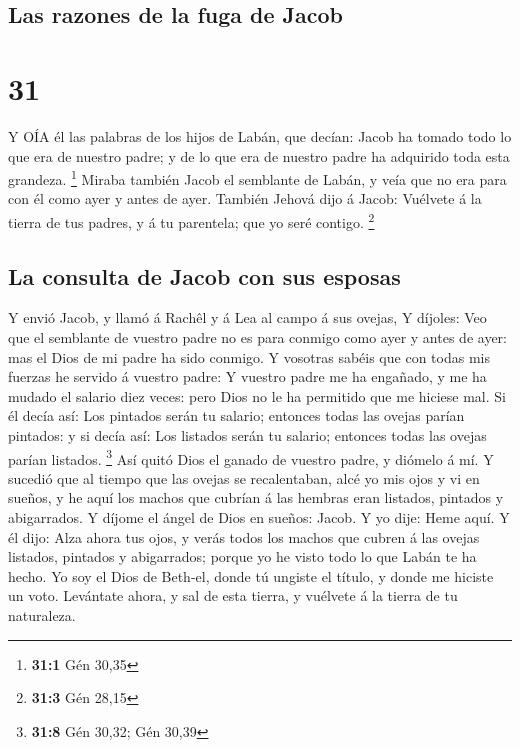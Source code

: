 \hypertarget{las-razones-de-la-fuga-de-jacob}{%
\subsection{Las razones de la fuga de
Jacob}\label{las-razones-de-la-fuga-de-jacob}}

\hypertarget{section-30}{%
\section{31}\label{section-30}}

 Y OÍA él las palabras de los hijos de Labán, que decían:
Jacob ha tomado todo lo que era de nuestro padre; y de lo que era de
nuestro padre ha adquirido toda esta grandeza. \footnote{\textbf{31:1}
  Gén 30,35}  Miraba también Jacob el semblante de Labán, y
veía que no era para con él como ayer y antes de ayer. 
También Jehová dijo á Jacob: Vuélvete á la tierra de tus padres, y á tu
parentela; que yo seré contigo. \footnote{\textbf{31:3} Gén 28,15}

\hypertarget{la-consulta-de-jacob-con-sus-esposas}{%
\subsection{La consulta de Jacob con sus
esposas}\label{la-consulta-de-jacob-con-sus-esposas}}

 Y envió Jacob, y llamó á Rachêl y á Lea al campo á sus
ovejas,  Y díjoles: Veo que el semblante de vuestro padre no
es para conmigo como ayer y antes de ayer: mas el Dios de mi padre ha
sido conmigo.  Y vosotras sabéis que con todas mis fuerzas
he servido á vuestro padre:  Y vuestro padre me ha engañado,
y me ha mudado el salario diez veces: pero Dios no le ha permitido que
me hiciese mal.  Si él decía así: Los pintados serán tu
salario; entonces todas las ovejas parían pintados: y si decía así: Los
listados serán tu salario; entonces todas las ovejas parían listados.
\footnote{\textbf{31:8} Gén 30,32; Gén 30,39}  Así quitó
Dios el ganado de vuestro padre, y diómelo á mí.  Y sucedió
que al tiempo que las ovejas se recalentaban, alcé yo mis ojos y vi en
sueños, y he aquí los machos que cubrían á las hembras eran listados,
pintados y abigarrados.  Y díjome el ángel de Dios en
sueños: Jacob. Y yo dije: Heme aquí.  Y él dijo: Alza ahora
tus ojos, y verás todos los machos que cubren á las ovejas listados,
pintados y abigarrados; porque yo he visto todo lo que Labán te ha
hecho.  Yo soy el Dios de Beth-el, donde tú ungiste el
título, y donde me hiciste un voto. Levántate ahora, y sal de esta
tierra, y vuélvete á la tierra de tu naturaleza.

